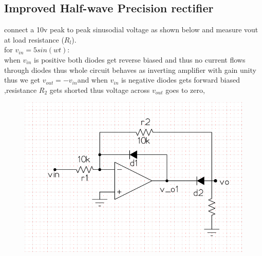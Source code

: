 \documentclass[12pt]{article}
\begin{document}
\subsection{Improved Half-wave Precision rectifier}
connect a 10v peak to peak sinusodial voltage as shown below and measure vout at load resistance (\(R_{l}\)).\\
for \(v_{in}=5sin(wt)\):\\
when \(v_{in}\) is positive both diodes get reverse biased and thus no current flows through diodes thus whole circuit behaves as inverting amplifier with gain unity thus we get \(v_{out} = -v_{in}\)and when \(v_{in}\) is negative diodes gets forward biased ,resistance \(R_{2}\) gets shorted thus voltage across \(v_{out}\) goes to zero, 
\begin{figure}[h!]
\centering
\includegraphics[scale = 0.6]{improved_half_wave_rectifier.png}
\end{figure}
\newpage
\end{document}
